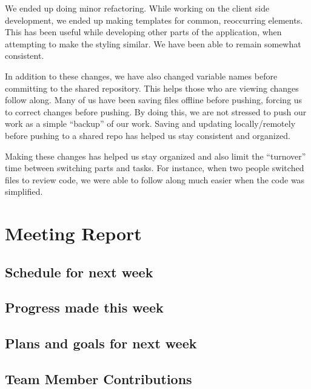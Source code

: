\documentclass[12pt]{article}
\begin{document}
We ended up doing minor refactoring. While working on the client side
development, we ended up making templates for common, reoccurring elements.
This has been useful while developing other parts of the application, when
attempting to make the styling similar. We have been able to remain somewhat
consistent.

In addition to these changes, we have also changed variable names before
committing to the shared repository. This helps those who are viewing
changes follow along. Many of us have been saving files offline before
pushing, forcing us to correct changes before pushing. By doing this, we are
not stressed to push our work as a simple “backup” of our work. Saving and
updating locally/remotely before pushing to a shared repo has helped us stay
consistent and organized.

Making these changes has helped us stay organized and also limit the
“turnover” time between switching parts and tasks. For instance, when two
people switched files to review code, we were able to follow along much
easier when the code was simplified.

\section{Meeting Report}
\subsection{Schedule for next week}

\subsection{Progress made this week}

\subsection{Plans and goals for next week}
\subsection{Team Member Contributions}
\end{document}
